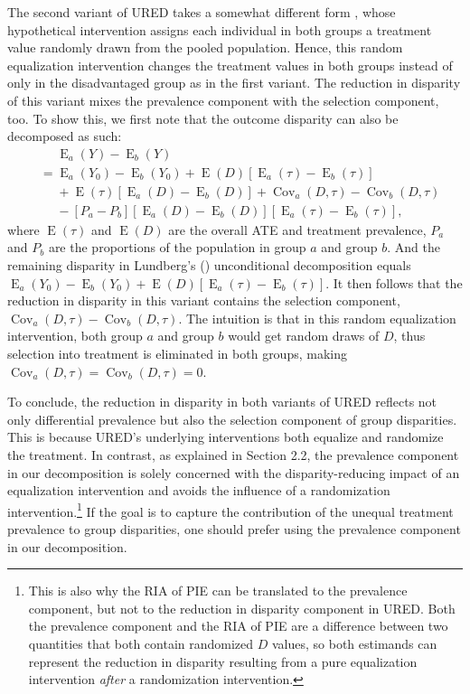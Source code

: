 \documentclass[12pt,a4paper]{article}
\newcommand{\Cov}{\operatorname{Cov}}
\newcommand{\E}{\operatorname{E}}
\begin{document}
The second variant of URED takes a somewhat different form \citep{lundberg_gap-closing_2022}, whose hypothetical intervention assigns each individual in both groups a treatment value randomly drawn from the pooled population. Hence, this random equalization intervention changes the treatment values in both groups instead of only in the disadvantaged group as in the first variant. The reduction in disparity of this variant  mixes the prevalence component with the selection component, too. To show this, we first note that the outcome disparity can also be decomposed as such: 
\begin{align*}
&\phantom{{}={}} \E_a(Y)-\E_b(Y) \\
&= \E_a(Y_{0})-\E_b(Y_{0}) +  \E(D)[ \E_a(\tau) - \E_b(\tau)]  \\
&\phantom{{}={}} +\E(\tau)[\E_a(D)-\E_b(D)] + \Cov_a(D, \tau) - \Cov_b(D, \tau) \\
&\phantom{{}={}} - [P_a-P_b][\E_a(D) - \E_b(D)][\E_a(\tau)-\E_b(\tau)], 
\end{align*} 
where $\E(\tau)$ and $\E(D)$ are the overall ATE and treatment prevalence, $P_a$ and $P_b$ are the proportions of the population in group $a$ and group $b$.
And the remaining disparity in Lundberg's (\citeyear{lundberg_gap-closing_2022}) unconditional decomposition equals 
$\E_a(Y_{0})-\E_b(Y_{0}) + \E(D)[ \E_a(\tau) - \E_b(\tau)] \nonumber$. It then follows that the reduction in disparity in this variant contains the selection component, $\Cov_a(D, \tau) -  \Cov_b(D, \tau)$. The intuition is that in this random equalization intervention, both group $a$ and group $b$ would get random draws of $D$, thus  selection into treatment is eliminated in both groups, making $\Cov_a(D,\tau)=\Cov_b(D,\tau)=0$.

To conclude, the reduction in disparity in both variants of URED reflects not only differential prevalence but also the selection component of group disparities. This is because URED's underlying interventions both equalize and randomize the treatment. In contrast, as explained in Section 2.2,  the prevalence component in our decomposition is solely concerned with the disparity-reducing impact of an equalization intervention and avoids the influence of a randomization intervention.\footnote{This is also why the RIA of PIE can be translated to the prevalence component, but not to the reduction in disparity component in URED. Both the prevalence component and the RIA of PIE are a difference between two quantities that both contain randomized $D$ values, so both estimands can represent the reduction in disparity resulting from a pure equalization intervention \emph{after} a randomization intervention.} If the goal is to capture the contribution of the unequal treatment prevalence to group disparities, one should prefer using the prevalence component in our decomposition.
 
\end{document}
